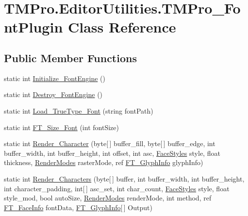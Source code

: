 \hypertarget{class_t_m_pro_1_1_editor_utilities_1_1_t_m_pro___font_plugin}{}\section{T\+M\+Pro.\+Editor\+Utilities.\+T\+M\+Pro\+\_\+\+Font\+Plugin Class Reference}
\label{class_t_m_pro_1_1_editor_utilities_1_1_t_m_pro___font_plugin}
\subsection*{Public Member Functions}
\begin{DoxyCompactItemize}
\item 
static int \mbox{\hyperlink{class_t_m_pro_1_1_editor_utilities_1_1_t_m_pro___font_plugin_a96b69a35efb81bc8a659370b0f6645fd}{Initialize\+\_\+\+Font\+Engine}} ()
\item 
static int \mbox{\hyperlink{class_t_m_pro_1_1_editor_utilities_1_1_t_m_pro___font_plugin_acbdd6b412f35fde6c65fca746aef646c}{Destroy\+\_\+\+Font\+Engine}} ()
\item 
static int \mbox{\hyperlink{class_t_m_pro_1_1_editor_utilities_1_1_t_m_pro___font_plugin_a724684e823e9bc0275d3e581bcd66fb0}{Load\+\_\+\+True\+Type\+\_\+\+Font}} (string font\+Path)
\item 
static int \mbox{\hyperlink{class_t_m_pro_1_1_editor_utilities_1_1_t_m_pro___font_plugin_ad0d49a9adc25f573accbc342dfb0f3c7}{F\+T\+\_\+\+Size\+\_\+\+Font}} (int font\+Size)
\item 
static int \mbox{\hyperlink{class_t_m_pro_1_1_editor_utilities_1_1_t_m_pro___font_plugin_af185165e8b68a7719c139d3cae57c511}{Render\+\_\+\+Character}} (byte\mbox{[}$\,$\mbox{]} buffer\+\_\+fill, byte\mbox{[}$\,$\mbox{]} buffer\+\_\+edge, int buffer\+\_\+width, int buffer\+\_\+height, int offset, int asc, \mbox{\hyperlink{namespace_t_m_pro_1_1_editor_utilities_ae783a93ab603d30fd45ab0e3f3c67394}{Face\+Styles}} style, float thickness, \mbox{\hyperlink{namespace_t_m_pro_1_1_editor_utilities_ac956f92fd288b0b627522e75a9c5b9ad}{Render\+Modes}} raster\+Mode, ref \mbox{\hyperlink{struct_t_m_pro_1_1_editor_utilities_1_1_f_t___glyph_info}{F\+T\+\_\+\+Glyph\+Info}} glyph\+Info)
\item 
static int \mbox{\hyperlink{class_t_m_pro_1_1_editor_utilities_1_1_t_m_pro___font_plugin_a04c37eb7d380c3116b123e91f02ab93c}{Render\+\_\+\+Characters}} (byte\mbox{[}$\,$\mbox{]} buffer, int buffer\+\_\+width, int buffer\+\_\+height, int character\+\_\+padding, int\mbox{[}$\,$\mbox{]} asc\+\_\+set, int char\+\_\+count, \mbox{\hyperlink{namespace_t_m_pro_1_1_editor_utilities_ae783a93ab603d30fd45ab0e3f3c67394}{Face\+Styles}} style, float style\+\_\+mod, bool auto\+Size, \mbox{\hyperlink{namespace_t_m_pro_1_1_editor_utilities_ac956f92fd288b0b627522e75a9c5b9ad}{Render\+Modes}} render\+Mode, int method, ref \mbox{\hyperlink{struct_t_m_pro_1_1_editor_utilities_1_1_f_t___face_info}{F\+T\+\_\+\+Face\+Info}} font\+Data, \mbox{\hyperlink{struct_t_m_pro_1_1_editor_utilities_1_1_f_t___glyph_info}{F\+T\+\_\+\+Glyph\+Info}}\mbox{[}$\,$\mbox{]} Output)

\end{DoxyCompactItemize}
